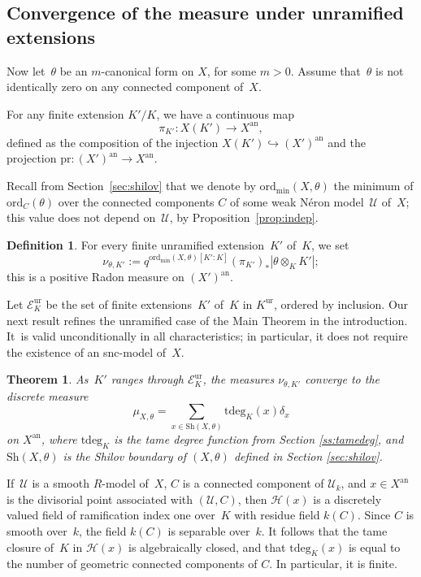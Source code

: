 \documentclass[11pt]{article}
\let\mathcal\mathscr
\newtheorem{theorem}[equation]{Theorem}
\theoremstyle{definition}
\newtheorem{definition}[equation]{Definition}
\numberwithin{equation}{subsection}
\newcommand{\cU}{\ensuremath{\mathscr{U}}}
\newcommand{\an}{\mathrm{an}}
\newcommand{\ord}{\mathrm{ord}}
\newcommand{\ordmin}{\ord_{\min}}
\newcommand{\pr}{\mathrm{pr}}
\newcommand{\Sh}{\mathrm{Sh}}
\newcommand{\tdeg}{\mathrm{tdeg}}
\newcommand{\ur}{\mathrm{ur}}
\let\form\theta
\begin{document}
\subsection{Convergence of the measure under unramified extensions}
Now let~$\form$ be an $m$-canonical form on $X$, for some $m>0$.
Assume that~$\form$ is not identically zero on any connected component of~$X$.

For any finite extension $K'/K$, we have a continuous map
\begin{equation*}
\pi_{K'}\colon X(K')\to X^{\an},
\end{equation*}
defined as the composition of the injection $X(K')\hookrightarrow(X')^{\an}$ and the projection $\pr\colon (X')^{\an}\to X^{\an}$.

Recall from Section~\ref{sec:shilov} that we denote by $\ordmin(X,\form)$ the minimum of
$\ord_C(\form)$ over the connected components $C$ of some weak Néron model~$\cU$ of~$X$; this value does not depend on~$\cU$, by Proposition~\ref{prop:indep}.

\begin{definition}\label{def:unram-measure}
For every finite unramified extension~$K'$ of~$K$, we set
\begin{equation*}
\nu_{\form,K'}:=q^{\ordmin(X,\form)[K'\colon K]}(\pi_{K'})_*|\form\otimes_K K'|;
\end{equation*}
this is a positive Radon measure on $(X')^{\an}$.
\end{definition}

Let $\mathcal{E}^{\ur}_K$ be the set of finite extensions~$K'$ of~$K$ in $K^{\ur}$, ordered by inclusion.
Our next result refines the unramified case of the Main Theorem in the introduction. It~is valid unconditionally in all characteristics; in particular, it does not require the existence of an snc-model of~$X$.

\begin{theorem}\label{thm:shi}
As~$K'$ ranges through $\mathcal{E}^{\ur}_K$, the measures $\nu_{\form,K'}$ converge to the discrete measure
\[
\mu_{X,\form}=\sum_{x\in \Sh(X,\form)}\tdeg_{K}(x)\delta_x
\]
on $X^{\an}$, where $\tdeg_K$ is the tame degree function from Section \ref{ss:tamedeg}, and $\Sh(X,\form)$ is the Shilov boundary of $(X,\form)$ defined in Section \ref{sec:shilov}.
\end{theorem}
If~$\cU$ is a smooth $R$\nobreakdash-model of~$X$, $C$ is a connected component of $\cU_k$, and $x\in X^{\an}$ is the divisorial point associated with $(\cU,C)$, then
$\mathscr{H}(x)$ is a discretely valued field of ramification index one over~$K$ with residue field $k(C)$. Since $C$ is smooth over~$k$, the field $k(C)$ is separable over~$k$.
It follows that the tame closure of~$K$ in $\mathscr{H}(x)$ is algebraically closed, and that
$\tdeg_K(x)$ is equal to the number of geometric connected components of $C$. In particular, it is finite.
\end{document}
